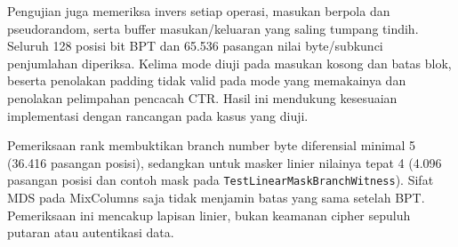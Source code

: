 Pengujian juga memeriksa invers setiap operasi, masukan berpola dan
pseudorandom, serta buffer masukan/keluaran yang saling tumpang tindih.
Seluruh 128 posisi bit BPT dan 65.536 pasangan nilai byte/subkunci
penjumlahan diperiksa. Kelima mode diuji pada masukan kosong dan batas
blok, beserta penolakan padding tidak valid pada mode yang memakainya
dan penolakan pelimpahan pencacah CTR. Hasil ini mendukung kesesuaian
implementasi dengan rancangan pada kasus yang diuji.

Pemeriksaan rank membuktikan branch number byte diferensial minimal 5
(36.416 pasangan posisi), sedangkan untuk masker linier nilainya tepat 4
(4.096 pasangan posisi dan contoh mask pada
\texttt{TestLinearMaskBranchWitness}). Sifat MDS pada MixColumns saja
tidak menjamin batas yang sama setelah BPT. Pemeriksaan ini mencakup
lapisan linier, bukan keamanan cipher sepuluh putaran atau autentikasi data.
